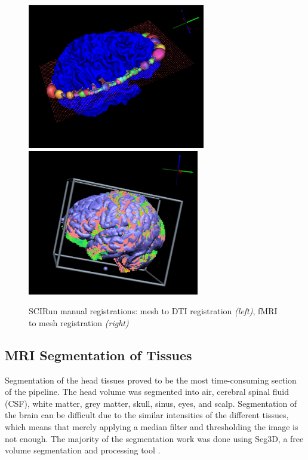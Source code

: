 \begin{figure}[H]
\begin{center}
\includegraphics[height = 2.5in]{Figures/DTI_reg}
\includegraphics[height = 2.5in]{Figures/fmri_reg}
\caption{SCIRun manual registrations: mesh to DTI registration \textit{(left)}, fMRI to mesh registration \textit{(right)}}
\label{fig:dtireg}
\end{center}
\end{figure}

\subsection{MRI Segmentation of Tissues}
\label{sec:Seg}


Segmentation of the head tissues proved to be the most time-consuming section of the pipeline. The head volume was segmented into air, cerebral spinal fluid (CSF), white matter, grey matter, skull, sinus, eyes, and scalp. Segmentation of the brain can be difficult due to the similar intensities of the different tissues, which means that merely applying a median filter and thresholding the image is not enough. The majority of the segmentation work was done using Seg3D, a free volume segmentation and processing tool \cite{ref:seg3d}.


